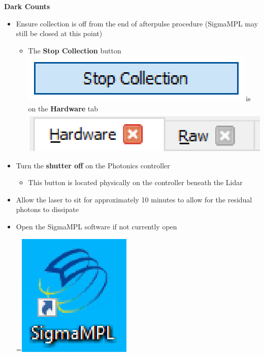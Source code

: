 \documentclass[11pt, oneside]{article}
\newenvironment{myitemize}
{ \begin{itemize}
    \setlength{\itemsep}{0pt}
    \setlength{\parskip}{0pt}
    \setlength{\parsep}{0pt}     }
{ \end{itemize}                  }
\begin{document}
\noindent\textbf{\LARGE Dark Counts}

\begin{myitemize}
\item Ensure collection is off from the end of afterpulse procedure (SigmaMPL may still be closed at this point)
\begin{myitemize}
\item The \textbf{Stop Collection} button \includegraphics[scale=0.3]{stopcollection_button.png} is on the 
	\textbf{Hardware} tab \includegraphics[scale=0.3]{hardware_tab.png}
\end{myitemize}
\item Turn the \textbf{shutter off} on the Photonics controller
\begin{myitemize}
\item This button is located physically on the controller beneath the Lidar
\end{myitemize}
\item Allow the laser to sit for approximately 10 minutes to allow for the residual photons to dissipate
\item Open the SigmaMPL software if not currently open {\begingroup
{}=\hbox{\includegraphics[scale=0.3]{sigmampl_icon.png}}%
\parbox{\wd0}{}\endgroup}


\end{myitemize}
\end{document}

